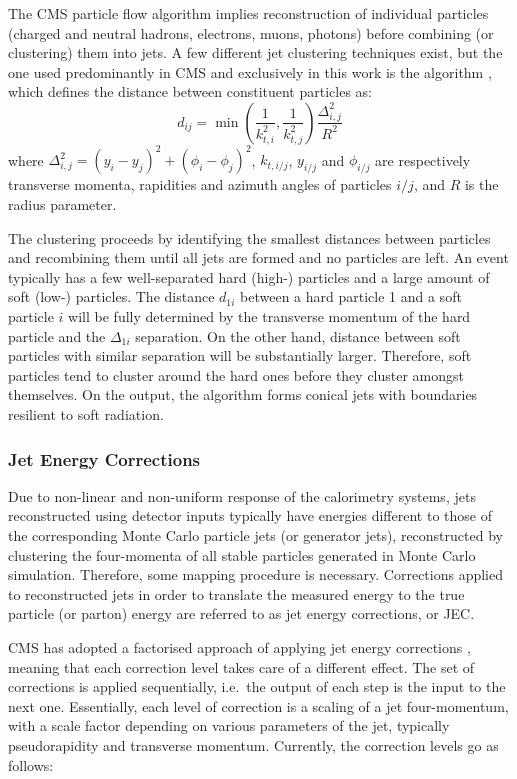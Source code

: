 The CMS particle flow algorithm implies reconstruction of individual particles (charged and neutral hadrons, electrons,
muons, photons) before combining (or clustering) them into jets. A few different jet clustering techniques exist, but
the one used predominantly in CMS and exclusively in this work is the \antikt algorithm \autocite{anti-kt}, which
defines the distance between constituent particles as:
\begin{equation}
d_{ij} = \min\left(\frac{1}{k^2_{t,i}},\frac{1}{k^2_{t,j}}\right) \frac{\Delta_{i,j}^2}{R^2}
\end{equation}
where $\Delta_{i,j}^2 = (y_i-y_j)^2 + (\phi_i-\phi_j)^2$, $k_{t,i/j}$, $y_{i/j}$ and $\phi_{i/j}$ are respectively
transverse momenta, rapidities and azimuth angles of particles $i/j$, and $R$ is the radius parameter.

The clustering proceeds by identifying the smallest distances between particles and recombining them until all jets are
formed and no particles are left. An event typically has a few well-separated hard (high-\pt) particles and a large
amount of soft (low-\pt) particles. The distance $d_{1i}$ between a hard particle 1 and a soft particle $i$ will be
fully determined by the transverse momentum of the hard particle and the $\Delta_{1i}$ separation. On the other hand,
distance between soft particles with similar separation will be substantially larger. Therefore, soft particles tend to
cluster around the hard ones before they cluster amongst themselves. On the output, the \antikt algorithm forms
conical jets with boundaries resilient to soft radiation.

\subsubsection{Jet Energy Corrections}
\label{sss:JEC}

Due to non-linear and non-uniform response of the calorimetry systems, jets reconstructed using detector inputs
typically have energies different to those of the corresponding Monte Carlo particle jets (or generator jets),
reconstructed by clustering the four-momenta of all stable particles generated in Monte Carlo simulation. Therefore,
some mapping procedure is necessary. Corrections applied to reconstructed jets in order to translate the measured energy
to the true particle (or parton) energy are referred to as jet energy corrections, or JEC.

CMS has adopted a factorised approach of applying jet energy corrections \autocite{JEC_CMS}, meaning that each
correction level takes care of a different effect. The set of corrections is applied sequentially, i.e.\ the output of
each step is the input to the next one. Essentially, each level of correction is a scaling of a jet four-momentum, with
a scale factor depending on various parameters of the jet, typically pseudorapidity and transverse momentum. Currently,
the correction levels go as follows:

